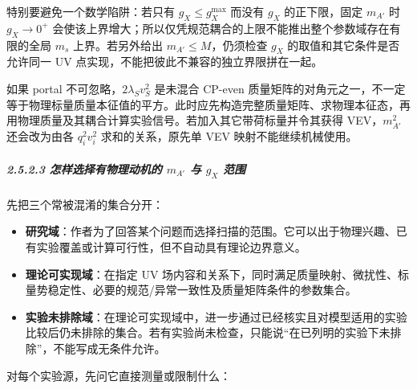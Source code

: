 \documentclass[
  chinese,
  UTF8]{ctexart}
\providecommand{\tightlist}{%
  \setlength{\itemsep}{0pt}\setlength{\parskip}{0pt}}
\begin{document}
特别要避免一个数学陷阱：若只有 \(g_X\leq g_X^{\max}\) 而没有 \(g_X\)
的正下限，固定 \(m_{A'}\) 时 \(g_X\to0^+\)
会使该上界增大；所以仅凭规范耦合的上限不能推出整个参数域存在有限的全局
\(m_s\) 上界。若另外给出 \(m_{A'}\leq M\)，仍须检查 \(g_X\)
的取值和其它条件是否允许同一 UV
点实现，不能把彼此不兼容的独立界限拼在一起。

如果 portal 不可忽略，\(2\lambda_Sv_S^2\) 是未混合 CP-even
质量矩阵的对角元之一，不一定等于物理标量质量本征值的平方。此时应先构造完整质量矩阵、求物理本征态，再用物理质量及其耦合计算实验信号。若加入其它带荷标量并令其获得
VEV，\(m_{A'}^2\) 还会改为由各 \(q_i^2v_i^2\) 求和的关系，原先单 VEV
映射不能继续机械使用。

\subparagraph{\texorpdfstring{2.5.2.3 怎样选择有物理动机的 \(m_{A'}\) 与
\(g_X\)
范围}{2.5.2.3 怎样选择有物理动机的 m\_\{A\textquotesingle\} 与 g\_X 范围}}\label{ux600eux6837ux9009ux62e9ux6709ux7269ux7406ux52a8ux673aux7684-m_a-ux4e0e-g_x-ux8303ux56f4}

先把三个常被混淆的集合分开：

\begin{itemize}
\tightlist
\item
  \textbf{研究域}：作者为了回答某个问题而选择扫描的范围。它可以出于物理兴趣、已有实验覆盖或计算可行性，但不自动具有理论边界意义。
\item
  \textbf{理论可实现域}：在指定 UV
  场内容和关系下，同时满足质量映射、微扰性、标量势稳定性、必要的规范/异常一致性及质量矩阵条件的参数集合。
\item
  \textbf{实验未排除域}：在理论可实现域中，进一步通过已经核实且对模型适用的实验比较后仍未排除的集合。若有实验尚未检查，只能说``在已列明的实验下未排除''，不能写成无条件允许。
\end{itemize}

对每个实验源，先问它直接测量或限制什么：
\end{document}
